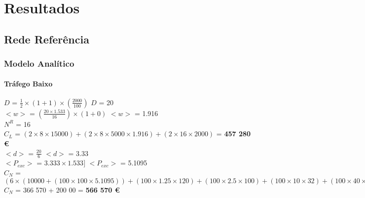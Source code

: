 \chapter{Resultados}
\label{chapter6}

\section{Rede Referência}
\label{ref}
\vspace{11pt}

\subsection{Modelo Analítico}
\vspace{11pt}

\subsubsection{Tráfego Baixo}

\vspace{11pt}

$D$ = ${\frac{1}{2}} \times {( 1 + 1 )} \times ( \frac{2000}{100} )$ \qquad \qquad $D$ = 20\\

$<w>$ = $(\frac{20 \times 1.533}{16} ) \times ( 1 + 0)$ \qquad \qquad $<w>$ = 1.916\\

$N^R$ = 16\\

$C_L$ = $(2 \times 8 \times 15 000) + (2 \times 8 \times 5 000 \times 1.916) + (2 \times 16 \times 2000)$ = \textbf{457 280 \euro}\\


$<d>$ = $\frac{20}{6}$ \qquad \qquad $<d>$ = 3.33\\

$<P_{exc}>$ = $3.333 \times 1.533]$ \qquad \quad $<P_{exc}>$ = 5.1095 \\


$C_N$ = $(6 \times (10 000 + (1 00 \times 100 \times 5.1095)) + (100 \times 1.25 \times 120) + (100 \times 2.5 \times 100) + (100 \times 10 \times 32) + (100 \times 40 \times 12) + (100 \times 100 \times 8)))$\\

$C_N$ = 366 570 + 200 00 = \textbf{566 570 \euro}\\

